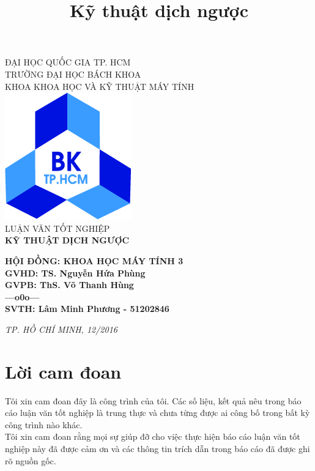 \documentclass[12pt]{report}
\title{Kỹ thuật dịch ngược}
\begin{document}
	\begin{center}
		\large{
		ĐẠI HỌC QUỐC GIA TP. HCM\\
		TRƯỜNG ĐẠI HỌC BÁCH KHOA\\
		KHOA KHOA HỌC VÀ KỸ THUẬT MÁY TÍNH\\[10ex]}
		\includegraphics[scale=0.5]{logoBK_jpg.jpg}\\[10ex]
		\large{LUẬN VĂN TỐT NGHIỆP\\[10ex]}
		\LARGE{\textbf{KỸ THUẬT DỊCH NGƯỢC}\\[10ex]}
	\end{center}
	
	\large{
		\textbf{
	\hspace*{4.95cm}HỘI ĐỒNG: KHOA HỌC MÁY TÍNH 3\\
	\hspace*{7cm}GVHD: TS. Nguyễn Hứa Phùng\\
	\hspace*{7.05cm}GVPB: ThS. Võ Thanh Hùng\\
	\hspace*{10cm}---o0o---\\
	\hspace*{7.05cm}SVTH: Lâm Minh Phương - 51202846\\[5ex]
	}
	\begin{center}
		\textit{TP. HỒ CHÍ MINH, 12/2016}
	\end{center}
	
	}
	\chapter*{Lời cam đoan}
	
	Tôi xin cam đoan đây là công trình của tôi. Các số liệu, kết quả nêu trong báo cáo luận văn tốt nghiệp là trung thực và chưa từng được ai công bố trong bất kỳ công trình
	nào khác.\\
	Tôi xin cam đoan rằng mọi sự giúp đỡ cho việc thực hiện báo cáo luận văn tốt nghiệp này đã được cảm ơn và các thông tin trích dẫn trong báo cáo đã được ghi rõ nguồn gốc.
	
\end{document}
